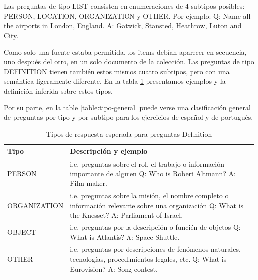 Las preguntas de tipo LIST consisten en enumeraciones de 4 subtipos posibles: PERSON, LOCATION, ORGANIZATION y OTHER.
Por ejemplo:\newline
Q: Name all the airports in London, England. \newline
A: Gatwick, Stansted, Heathrow, Luton and City.

Como solo una fuente estaba permitida, los items debían aparecer en secuencia, uno después del otro, en un solo documento de la colección.
Las preguntas de tipo DEFINITION tienen también estos mismos cuatro subtipos, pero con una semántica ligeramente diferente. En la tabla \ref{table:definition-questions} presentamos ejemplos y la definición inferida sobre estos tipos.

Por su parte, en la table \ref{table:tipo-general} puede verse una clasificación general de preguntas por tipo y por subtipo para los ejercicios de español y de portugués.

\begin{center}
\begin{table}[H]
\centering
\begin{tabular}{| l | p{12cm}|}
\hline
Tipo & Descripción y ejemplo \\ \hline
PERSON & i.e. preguntas sobre el rol, el trabajo o información importante de alguien \newline
 Q: Who is Robert Altmann? \newline
 A: Film maker. \\ \hline
ORGANIZATION & i.e. preguntas sobre la misión, el nombre completo o información relevante sobre una organización \newline
 Q: What is the Knesset? \newline
 A: Parliament of Israel. \\ \hline
OBJECT & i.e. preguntas por la descripción o función de objetos \newline
Q: What is Atlantis? \newline
A: Space Shuttle. \\ \hline
OTHER & i.e. preguntas por descripciones de fenómenos naturales, tecnologías, procedimientos legales, etc. \newline
Q: What is Eurovision? \newline
A: Song contest. \\ \hline
\end{tabular}
\caption{Tipos de respuesta esperada para preguntas Definition}
\label{table:definition-questions}
\end{table}
\end{center}


